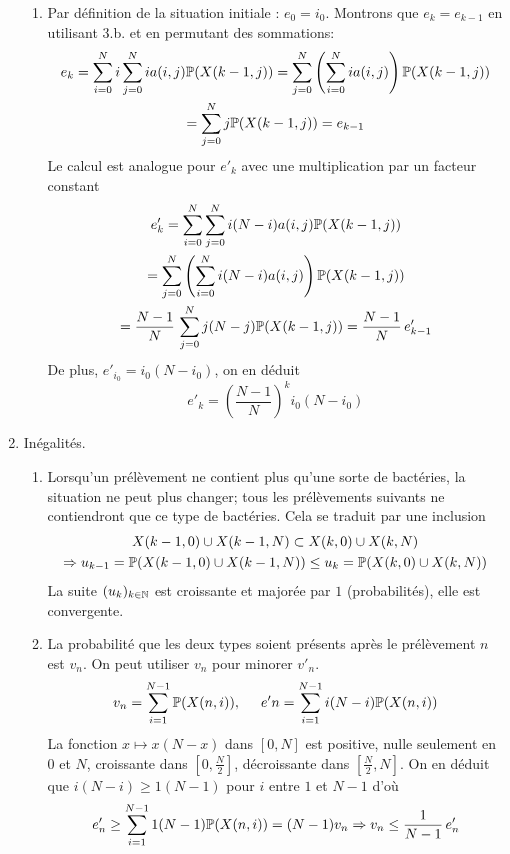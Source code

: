 \begin{enumerate}
\begin{enumerate}
  \item Par définition de la situation initiale : $e_0 = i_0$. Montrons que $e_{k}=e_{k-1}$ en utilisant 3.b. et en permutant des sommations:
\begin{multline*}
e_k = \sum_{i=0}^{N} i \sum_{j=0}^{N}ia(i,j)\mathbb{P}(X(k-1,j))
= \sum_{j=0}^{N} \left( \sum_{i=0}^{N} ia(i,j)\right) \mathbb{P}(X(k-1,j))\\
= \sum_{j=0}^{N} j \mathbb{P}(X(k-1,j)) = e_{k-1}
\end{multline*}
Le calcul est analogue pour $e'_k$ avec une multiplication par un facteur constant 
\begin{multline*}
e'_k = \sum_{i=0}^{N}  \sum_{j=0}^{N}i(N-i)a(i,j)\mathbb{P}(X(k-1,j))\\
= \sum_{j=0}^{N} \left( \sum_{i=0}^{N} i(N-i)a(i,j)\right) \mathbb{P}(X(k-1,j))\\
= \frac{N-1}{N}\,\sum_{j=0}^{N} j(N-j) \mathbb{P}(X(k-1,j)) = \frac{N-1}{N}\, e'_{k-1}
\end{multline*}
De plus, $e'_{i_0}=i_0(N-i_0)$, on en déduit
\begin{displaymath}
  e'_k = \left(\frac{N-1}{N}\right)^{k}i_0(N-i_0) 
\end{displaymath}

\end{enumerate}

  \item Inégalités.
\begin{enumerate}
  \item Lorsqu'un prélèvement ne contient plus qu'une sorte de bactéries, la situation ne peut plus changer; tous les prélèvements suivants ne contiendront que ce type de bactéries. Cela se traduit par une inclusion 
\begin{multline*}
X(k-1,0)\cup X(k-1,N) \subset X(k,0)\cup X(k,N)\\
\Rightarrow u_{k-1} = \mathbb{P}(X(k-1,0)\cup X(k-1,N)) \leq u_k = \mathbb{P}(X(k,0)\cup X(k,N))
\end{multline*}
La suite $(u_k)_{k\in \mathbb{N}}$ est croissante et majorée par $1$ (probabilités), elle est convergente. 
  \item La probabilité que les deux types soient présents après le prélèvement $n$ est $v_n$. On peut utiliser $v_n$ pour minorer $v'_n$.
\begin{displaymath}
v_n = \sum_{i=1}^{N-1}\mathbb{P}(X(n,i)), \hspace{0.5cm}
e'n = \sum_{i=1}^{N-1}i(N-i)\mathbb{P}(X(n,i))
\end{displaymath}
La fonction $x\mapsto x(N-x)$ dans $[0,N]$ est positive, nulle seulement en $0$ et $N$, croissante dans $[0,\frac{N}{2}]$, décroissante dans $[\frac{N}{2},N]$. On en déduit que $i(N-i)\geq 1(N-1)$ pour $i$ entre $1$ et $N-1$ d'où
\begin{displaymath}
  e'_n \geq \sum_{i=1}^{N-1}1(N-1)\mathbb{P}(X(n,i)) = (N-1)v_n \Rightarrow v_n \leq \frac{1}{N-1}\, e'_n
\end{displaymath}
\end{enumerate}


\end{enumerate}
